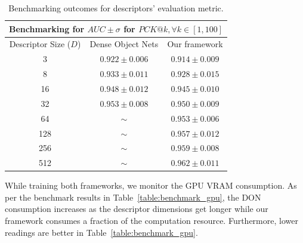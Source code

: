 \begin{table}[htb]
    \caption{Benchmarking outcomes for descriptors' evaluation metric.}
    \centering
    \label{table:benchmark_auc}
    \begin{tabular}{ccc}
        \toprule
        \multicolumn{3}{c}{Benchmarking for $AUC \pm \sigma$ for $PCK@k, \forall k \in [1, 100]$} \\
        \midrule
        Descriptor Size ($D$) & Dense Object Nets          & Our framework                        \\ \hline
        3                     & $\mathbf{0.922 \pm 0.006}$ & $0.914 \pm 0.009$                    \\
        8                     & $\mathbf{0.933 \pm 0.011}$ & $0.928 \pm 0.015$                    \\
        16                    & $\mathbf{0.948 \pm 0.012}$ & $0.945 \pm 0.010$                    \\
        32                    & $\mathbf{0.953 \pm 0.008}$ & $0.950 \pm 0.009$                    \\
        64                    & $ \mathtt{\sim}$           & $0.953 \pm 0.006$                    \\
        128                   & $ \mathtt{\sim}$           & $0.957 \pm 0.012$                    \\
        256                   & $ \mathtt{\sim}$           & $0.959 \pm 0.008$                    \\
        512                   & $ \mathtt{\sim}$           & $0.962 \pm 0.011$                    \\
        \bottomrule
    \end{tabular}
\end{table}

While training both frameworks, we monitor the GPU VRAM consumption.
As per the benchmark results in Table~\ref{table:benchmark_gpu},
the DON consumption increases as the descriptor dimensions get longer while our
framework consumes a fraction of the computation resource.
Furthermore, lower readings are better in Table~\ref{table:benchmark_gpu}.

